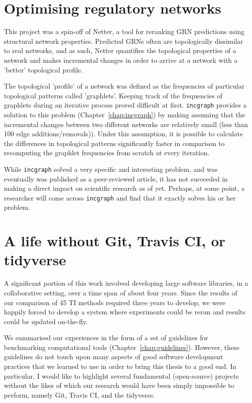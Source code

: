 \section{Optimising regulatory networks}
This project was a spin-off of Netter\cite{ruyssinck_netterrerankinggene_2016}, a tool for reranking GRN predictions using structural network properties. 
Predicted GRNs often are topologically dissimilar to real networks, and as such, Netter quantifies the topological properties of a network and makes incremental changes in order to arrive at a network with a 'better' topological profile.

The topological 'profile' of a network was defined as the frequencies of particular topological patterns called 'graphlets'. Keeping track of the frequencies of graphlets during an iterative process proved difficult at first. 
\texttt{incgraph} provides a solution to this problem (Chapter~\ref{chap:incgraph}) by making assuming that the incremental changes between two different networks are relatively small (less than 100 edge additions/removals)). Under this assumption, it is possible to calculate the differences in topological patterns significantly faster in comparison to recomputing the graphlet frequencies from scratch at every iteration.

While \texttt{incgraph} solved a very specific and interesting problem, and was eventually was published as a peer-reviewed article, it has not succeeded in making a direct impact on scientific research as of yet. Perhaps, at some point, a researcher will come across \texttt{incgraph} and find that it exactly solves his or her problem.


\section{A life without Git, Travis CI, or tidyverse}
A significant portion of this work involved developing large software libraries, in a collaborative setting, over a time span of about four years. Since the results of our comparison of 45 TI methods required three years to develop, we were happily forced to develop a system where experiments could be rerun and results could be updated on-the-fly.

We summarised our experiences in the form of a set of guidelines for benchmarking computational tools (Chapter~\ref{chap:guidelines}). However, these guidelines do not touch upon many aspects of good software development practices that we learned to use in order to bring this thesis to a good end. In particular, I would like to highlight several  fundamental (open-source) projects without the likes of which our research would have been simply impossible to perform, namely Git, Travis CI, and the tidyverse.

